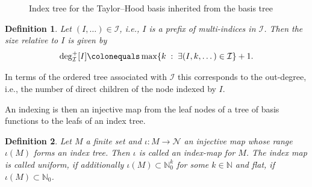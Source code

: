 \documentclass[a4paper,10pt,headings=normal,bibliography=totoc]{scrartcl}
\newtheorem{definition}{Definition}
\newcommand{\op}[1]{\operatorname{#1}}
\newcommand{\st}{\; : \;}
\begin{document}
\begin{figure}
\begin{center}
    \end{center}
    \caption{Index tree for the Taylor--Hood basis inherited from the basis tree}
    \label{fig:taylor_hood_index_tree}
\end{figure}


\begin{definition}
Let $(I,\dots) \in \mathcal{I}$, i.e., $I$ is a
prefix of multi-indices in $\mathcal{I}$. Then the size relative
to $I$ is given by
\begin{align}\label{eq:prefix_size}
  \operatorname{deg}^+_{\mathcal{I}}[I] \colonequals  \op{max}\{k \st \exists (I,k,\dots) \in \mathcal{I} \}+1.
\end{align}
\end{definition}
In terms of the ordered tree associated with $\mathcal{I}$ this corresponds
to the out-degree, i.e., the number of direct children of the node indexed by $I$.


An indexing is then an injective map from the leaf nodes of a tree of basis functions to the leafs of an
index tree.

\begin{definition}
  Let $M$ a finite set and $\iota:M \to \mathcal{N}$ an injective map whose range
  $\iota(M)$ forms an index tree.
  Then $\iota$ is called an \emph{index-map} for $M$.
  The index map is called \emph{uniform}, if additionally $\iota(M) \subset \mathbb{N}^k_0$ for some $k \in \mathbb{N}$
  and \emph{flat}, if $\iota(M) \subset \mathbb{N}_0$.
\end{definition}
\end{document}
